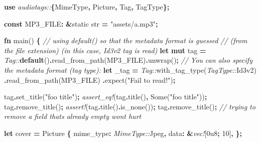 \documentclass[
]{book}
\newenvironment{Shaded}{\begin{snugshade}}{\end{snugshade}}
\newcommand{\CommentTok}[1]{\textcolor[rgb]{0.56,0.35,0.01}{\textit{#1}}}
\newcommand{\ConstantTok}[1]{\textcolor[rgb]{0.00,0.00,0.00}{#1}}
\newcommand{\DataTypeTok}[1]{\textcolor[rgb]{0.13,0.29,0.53}{#1}}
\newcommand{\DecValTok}[1]{\textcolor[rgb]{0.00,0.00,0.81}{#1}}
\newcommand{\KeywordTok}[1]{\textcolor[rgb]{0.13,0.29,0.53}{\textbf{#1}}}
\newcommand{\NormalTok}[1]{#1}
\newcommand{\OperatorTok}[1]{\textcolor[rgb]{0.81,0.36,0.00}{\textbf{#1}}}
\newcommand{\OtherTok}[1]{\textcolor[rgb]{0.56,0.35,0.01}{#1}}
\newcommand{\PreprocessorTok}[1]{\textcolor[rgb]{0.56,0.35,0.01}{\textit{#1}}}
\newcommand{\StringTok}[1]{\textcolor[rgb]{0.31,0.60,0.02}{#1}}
\begin{document}
\begin{Shaded}
\begin{Highlighting}[]
\KeywordTok{use} \PreprocessorTok{audiotags::}\OperatorTok{\{}\NormalTok{MimeType}\OperatorTok{,}\NormalTok{ Picture}\OperatorTok{,}\NormalTok{ Tag}\OperatorTok{,}\NormalTok{ TagType}\OperatorTok{\};}

\KeywordTok{const}\NormalTok{ MP3\_FILE}\OperatorTok{:} \OperatorTok{\&}\OtherTok{\textquotesingle{}static} \DataTypeTok{str} \OperatorTok{=} \StringTok{"assets/a.mp3"}\OperatorTok{;}

\KeywordTok{fn}\NormalTok{ main() }\OperatorTok{\{}
    \CommentTok{// using \textasciigrave{}default()\textasciigrave{} so that the metadata format is guessed}
    \CommentTok{// (from the file extension) (in this case, Id3v2 tag is read)}
    \KeywordTok{let} \KeywordTok{mut}\NormalTok{ tag }\OperatorTok{=} \PreprocessorTok{Tag::}\KeywordTok{default}\NormalTok{()}\OperatorTok{.}\NormalTok{read\_from\_path(MP3\_FILE)}\OperatorTok{.}\NormalTok{unwrap()}\OperatorTok{;}
    \CommentTok{// You can also specify the metadata format (tag type):}
    \KeywordTok{let}\NormalTok{ \_tag }\OperatorTok{=} \PreprocessorTok{Tag::}\NormalTok{with\_tag\_type(}\PreprocessorTok{TagType::}\NormalTok{Id3v2)}
        \OperatorTok{.}\NormalTok{read\_from\_path(MP3\_FILE)}
        \OperatorTok{.}\NormalTok{expect(}\StringTok{"Fail to read!"}\NormalTok{)}\OperatorTok{;}

\NormalTok{    tag}\OperatorTok{.}\NormalTok{set\_title(}\StringTok{"foo title"}\NormalTok{)}\OperatorTok{;}
    \PreprocessorTok{assert\_eq!}\NormalTok{(tag}\OperatorTok{.}\NormalTok{title()}\OperatorTok{,} \ConstantTok{Some}\NormalTok{(}\StringTok{"foo title"}\NormalTok{))}\OperatorTok{;}
\NormalTok{    tag}\OperatorTok{.}\NormalTok{remove\_title()}\OperatorTok{;}
    \PreprocessorTok{assert!}\NormalTok{(tag}\OperatorTok{.}\NormalTok{title()}\OperatorTok{.}\NormalTok{is\_none())}\OperatorTok{;}
\NormalTok{    tag}\OperatorTok{.}\NormalTok{remove\_title()}\OperatorTok{;}
    \CommentTok{// trying to remove a field that\textquotesingle{}s already empty won\textquotesingle{}t hurt}

    \KeywordTok{let}\NormalTok{ cover }\OperatorTok{=}\NormalTok{ Picture }\OperatorTok{\{}
\NormalTok{        mime\_type}\OperatorTok{:} \PreprocessorTok{MimeType::}\NormalTok{Jpeg}\OperatorTok{,}
\NormalTok{        data}\OperatorTok{:} \OperatorTok{\&}\PreprocessorTok{vec!}\NormalTok{[}\DecValTok{0u8}\OperatorTok{;} \DecValTok{10}\NormalTok{]}\OperatorTok{,}
    \OperatorTok{\};}


\end{Highlighting}
\end{Shaded}
\end{document}
